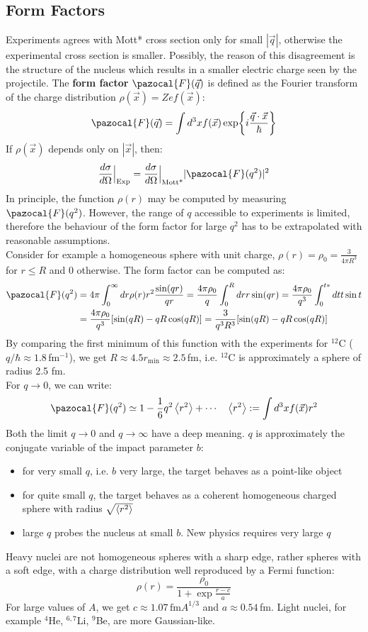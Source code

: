 \documentclass[10.75pt,a4paper,openright,bottom=2cm]{article}
\begin{document}
\subsection{Form Factors}
Experiments agrees with Mott* cross section only for small $|\Vec{q}|$, otherwise the experimental cross section is smaller. Possibly, the reason of this disagreement is the structure of the nucleus which results in a smaller electric charge seen by the projectile. The \textbf{form factor} $\pazocal{F}(\Vec{q})$ is defined as the Fourier transform of the charge distribution $\rho(\Vec{x})=Zef(\Vec{x})$:
\[
\pazocal{F}(\Vec{q})=\int d^3xf(\Vec{x})\exp{i\frac{\Vec{q}\cdot\Vec{x}}{\hbar}}
\]
If $\rho(\Vec{x})$ depends only on $|\Vec{x}|$, then:
\[
\frac{d\sigma}{d\Omega}\Bigr|_{\substack{\text{Exp}}}=\frac{d\sigma}{d\Omega}\Bigr|_{\substack{\text{Mott*}}}|\pazocal{F}(q^2)|^2
\]
In principle, the function $\rho(r)$ may be computed by measuring $\pazocal{F}(q^2)$. However, the range of $q$ accessible to experiments is limited, therefore the behaviour of the form factor for large $q^2$ has to be extrapolated with reasonable assumptions.\\
Consider for example a homogeneous sphere with unit charge, $\rho(r)=\rho_0=\frac{3}{4\pi R^3}$ for $r\le R$ and 0 otherwise. The form factor can be computed as:
\begin{align*}
\pazocal{F}(q^2)&=4\pi\int_0^\infty dr\rho(r)r^2\frac{\sin(qr)}{qr}=\frac{4\pi\rho_0}{q}\int_0^Rdrr\sin(qr)=\frac{4\pi\rho_0}{q^3}\int_0^{t*}dtt\sin t\\
&=\frac{4\pi\rho_0}{q^3}[\sin(qR)-qR\cos(qR)]=\frac{3}{q^3R^3}[\sin(qR)-qR\cos(qR)]
\end{align*}
By comparing the first minimum of this function with the experiments for $^{12}$C ($q/\hbar\approx1.8$\,fm$^{-1}$), we get $R\approx4.5 r_{\min}\approx2.5$\,fm, i.e. $^{12}$C is approximately a sphere of radius 2.5 fm.\\
For $q\to0$, we can write:
\[
\pazocal{F}(q^2)\simeq1-\frac{1}{6}q^2\Braket{r^2}+\cdots \quad \Braket{r^2}:=\int d^3xf(\Vec{x})r^2
\]
Both the limit $q\to0$ and $q\to\infty$ have a deep meaning. $q$ is approximately the conjugate variable of the impact parameter $b$:
\begin{itemize}
    \item for very small $q$, i.e. $b$ very large, the target behaves as a point-like object
    \item for quite small $q$, the target behaves as a coherent homogeneous charged sphere with radius $\sqrt{\Braket{r^2}}$
    \item large $q$ probes the nucleus at small $b$. New physics requires very large $q$
\end{itemize}
Heavy nuclei are not homogeneous spheres with a sharp edge, rather spheres with a soft edge, with a charge distribution well reproduced by a Fermi function:
\[
\rho(r)=\frac{\rho_0}{1+\exp{\frac{r-c}{a}}}
\]
For large values of $A$, we get $c\approx1.07\,\text{fm}A^{1/3}$ and $a\approx0.54$\,fm.
Light nuclei, for example $^4$He, $^{6,7}$Li, $^9$Be, are more Gaussian-like.
\end{document}

